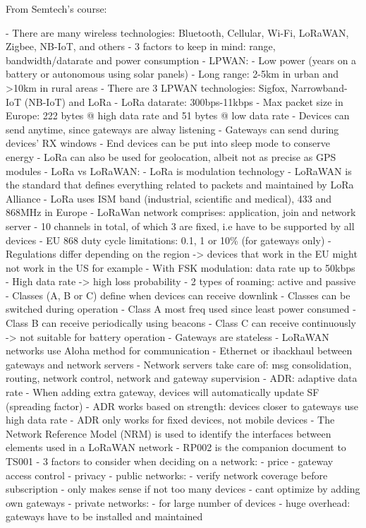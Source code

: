 From Semtech's course:

- There are many wireless technologies: Bluetooth, Cellular, Wi-Fi, LoRaWAN, Zigbee, NB-IoT, and others
- 3 factors to keep in mind: range, bandwidth/datarate and power consumption
- LPWAN:
    - Low power (years on a battery or autonomous using solar panels)
    - Long range: 2-5km in urban and >10km in rural areas
- There are 3 LPWAN technologies: Sigfox, Narrowband-IoT (NB-IoT) and LoRa 
- LoRa datarate: 300bps-11kbps
- Max packet size in Europe: 222 bytes @ high data rate and 51 bytes @ low data rate
- Devices can send anytime, since gateways are alway listening
- Gateways can send during devices' RX windows
- End devices can be put into sleep mode to conserve energy
- LoRa can also be used for geolocation, albeit not as precise as GPS modules
- LoRa vs LoRaWAN:
    - LoRa is modulation technology
    - LoRaWAN is the standard that defines everything related to packets and maintained by LoRa Alliance
- LoRa uses ISM band (industrial, scientific and medical), 433 and 868MHz in Europe
- LoRaWan network comprises: application, join and network server
- 10 channels in total, of which 3 are fixed, i.e have to be supported by all devices
- EU 868 duty cycle limitations: 0.1, 1 or 10\% (for gateways only)
- Regulations differ depending on the region -> devices that work in the EU might not work in the US for example
- With FSK modulation: data rate up to 50kbps
- High data rate -> high loss probability
- 2 types of roaming: active and passive
- Classes (A, B or C) define when devices can receive downlink
- Classes can be switched during operation
- Class A most freq used since least power consumed
- Class B can receive periodically using beacons
- Class C can receive continuously -> not suitable for battery operation
- Gateways are stateless
- LoRaWAN networks use Aloha method for communication
- Ethernet or ibackhaul between gateways and network servers
- Network servers take care of: msg consolidation, routing, network control, network and gateway supervision
- ADR: adaptive data rate
- When adding extra gateway, devices will automatically update SF (spreading factor)
- ADR works based on strength: devices closer to gateways use high data rate
- ADR only works for fixed devices, not mobile devices
- The Network Reference Model (NRM) is used to identify the interfaces between elements used in a LoRaWAN network
- RP002 is the companion document to TS001
- 3 factors to consider when deciding on a network:
    - price 
    - gateway access control 
    - privacy
- public networks:
    - verify network coverage before subscription
    - only makes sense if not too many devices
    - cant optimize by adding own gateways
- private networks:
    - for large number of devices 
    - huge overhead: gateways have to be installed and maintained

